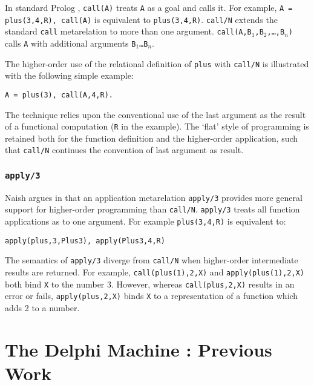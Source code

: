 In standard Prolog \cite{DEC96}, \texttt{call(A)} treats \texttt{A} as a
goal and calls it.  For example, \texttt{A = plus(3,4,R), call(A)} is equivalent
to \texttt{plus(3,4,R)}.  \texttt{call/N} \cite{Nai96}
extends the standard \texttt{call} metarelation to more than one argument.
\texttt{call(A,B$_1$,B$_2$,\ldots,B$_n$)} calls \texttt{A} with additional
arguments \texttt{B$_1$\ldots B$_n$}.

The higher-order use of the relational definition of \texttt{plus} with \texttt{call/N}
is illustrated with the following simple example:
\begin{verbatim}
A = plus(3), call(A,4,R).
\end{verbatim}
The technique relies upon the conventional use of the last argument as the result of 
a functional computation (\texttt{R} in the example).  The `flat' style of 
programming is retained both for the function definition and the higher-order
application, such that \texttt{call/N} continues the convention of last argument as
result.

\subsubsection{\texttt{apply/3}}

Naish argues in \cite{Nai96} that an application metarelation \texttt{apply/3} provides
more general support for higher-order programming than \texttt{call/N}.  \texttt{apply/3}
treats all function applications as to one argument.  For example \texttt{plus(3,4,R)} is
equivalent to:
\begin{verbatim}
apply(plus,3,Plus3), apply(Plus3,4,R)
\end{verbatim}

The semantics of \texttt{apply/3} diverge from \texttt{call/N} when
higher-order intermediate results are returned.  For example, 
\texttt{call(plus(1),2,X)} and \texttt{apply(plus(1),2,X)} both bind \texttt{X} to
the number 3.  However, whereas \texttt{call(plus,2,X)} results in an error or
fails, \texttt{apply(plus,2,X)} binds \texttt{X} to a representation of a function
which adds 2 to a number.

\section{The Delphi Machine : Previous Work} %
\label{delphi_machine_pwork}

